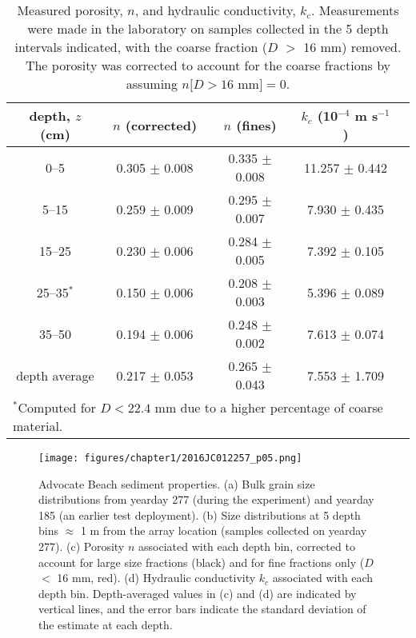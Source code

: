 \begin{table}
	\caption[Measured sediment porosity and hydraulic conductivity with sediment depth]{Measured porosity, $n$, and hydraulic conductivity, $k_{c}$. Measurements were made in the laboratory on samples collected in the 5 depth intervals indicated, with the coarse fraction ($D$ $>$ 16 mm) removed. The porosity was corrected to account for the coarse fractions by assuming $n[D>16$ mm$]=0$.}
	\label{tbl:n}
	\centering
	\begin{tabular}{ccccc}
		\hline
		depth, $z$ (cm) & $n$ (corrected) & $n$ (fines) & $k_{c}$ (10$^{-4}$ m s$^{-1}$)\\
		\hline
		0--5 & 0.305 $\pm$ 0.008 & 0.335 $\pm$ 0.008 & 11.257 $\pm$ 0.442\\
		5--15 & 0.259 $\pm$ 0.009 & 0.295 $\pm$ 0.007 & 7.930 $\pm$ 0.435\\
		15--25 & 0.230 $\pm$ 0.006 & 0.284 $\pm$ 0.005 & 7.392 $\pm$ 0.105\\
		25--35$^{*}$ & 0.150 $\pm$ 0.006 & 0.208 $\pm$ 0.003 & 5.396 $\pm$ 0.089\\
		35--50 & 0.194 $\pm$ 0.006 & 0.248 $\pm$ 0.002 & 7.613 $\pm$ 0.074\\
		\hline
		depth average  & 0.217 $\pm$ 0.053 & 0.265 $\pm$ 0.043 & 7.553 $\pm$ 1.709\\
		\hline
		\multicolumn{4}{l}{$^{*}$Computed for $D<22.4$ mm due to a higher percentage of coarse material.}
	\end{tabular}
\end{table}

\begin{figure} %
		\noindent\texttt{[image: figures/chapter1/2016JC012257\_p05.png]}
	\caption[Grain size distribution, porosity, and hydraulic conductivity with sediment depth]{Advocate Beach sediment properties. (a) Bulk grain size distributions from yearday 277 (during the experiment) and yearday 185 (an earlier test deployment). (b) Size distributions at 5 depth bins $\approx$ 1 m from the array location (samples collected on yearday 277). (c) Porosity $n$ associated with each depth bin, corrected to account for large size fractions (black) and for fine fractions only ($D$ $<$ 16 mm, red). (d) Hydraulic conductivity $k_{c}$ associated with each depth bin. Depth-averaged values in (c) and (d) are indicated by vertical lines, and the error bars indicate the standard deviation of the estimate at each depth.}
	\label{fig:soilstats}
\end{figure}



